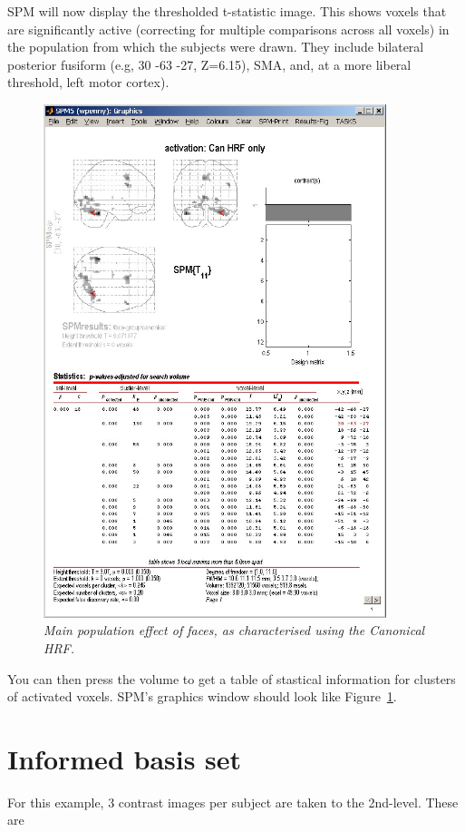 SPM will now display the thresholded t-statistic image. This shows voxels that are significantly active (correcting for multiple comparisons across all voxels) in the population from which the subjects were drawn. They include bilateral posterior fusiform (e.g, 30 -63 -27, Z=6.15), SMA, and, at a more liberal threshold, left motor cortex). 
\begin{figure}
\begin{center}
\includegraphics[width=100mm]{faces_group/t1_res}
\caption{\em Main population effect of faces, as characterised using the Canonical HRF. \label{t1_res}}
\end{center}
\end{figure}
You can then press the volume to get a table of stastical information for clusters of activated voxels. SPM's graphics window should look like Figure~\ref{t1_res}.

\section{Informed basis set}

For this example, 3 contrast images per subject are taken to the 2nd-level. These are

